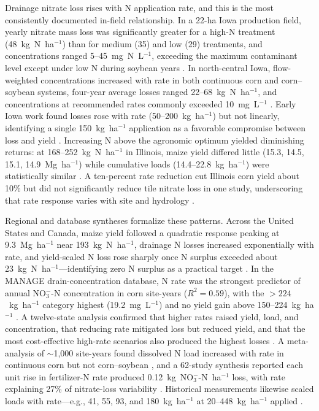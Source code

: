 \documentclass[11pt]{article}
\begin{document}
Drainage nitrate loss rises with N application rate, and this is the most consistently documented in-field relationship. In a 22-ha Iowa production field, yearly nitrate mass loss was significantly greater for a high-N treatment (48~kg~N~ha$^{-1}$) than for medium (35) and low (29) treatments, and concentrations ranged 5--45~mg~N~L$^{-1}$, exceeding the maximum contaminant level except under low N during soybean years \parencite{Jaynes2001}. In north-central Iowa, flow-weighted concentrations increased with rate in both continuous corn and corn--soybean systems, four-year average losses ranged 22--68~kg~N~ha$^{-1}$, and concentrations at recommended rates commonly exceeded 10~mg~L$^{-1}$ \parencite{Helmers2012b}. Early Iowa work found losses rose with rate (50--200~kg~ha$^{-1}$) but not linearly, identifying a single 150~kg~ha$^{-1}$ application as a favorable compromise between loss and yield \parencite{Azevedo1997}. Increasing N above the agronomic optimum yielded diminishing returns: at 168--252~kg~N~ha$^{-1}$ in Illinois, maize yield differed little (15.3, 14.5, 15.1, 14.9~Mg~ha$^{-1}$) while cumulative loads (14.4--22.8~kg~ha$^{-1}$) were statistically similar \parencite{Li2023b}. A ten-percent rate reduction cut Illinois corn yield about 10\% but did not significantly reduce tile nitrate loss in one study, underscoring that rate response varies with site and hydrology \parencite{Gentry2024}.

Regional and database syntheses formalize these patterns. Across the United States and Canada, maize yield followed a quadratic response peaking at 9.3~Mg~ha$^{-1}$ near 193~kg~N~ha$^{-1}$, drainage N losses increased exponentially with rate, and yield-scaled N loss rose sharply once N surplus exceeded about 23~kg~N~ha$^{-1}$---identifying zero N surplus as a practical target \parencite{Zhao2016}. In the MANAGE drain-concentration database, N rate was the strongest predictor of annual NO$_3^-$-N concentration in corn site-years ($R^2=0.59$), with the $>224$~kg~ha$^{-1}$ category highest (19.2~mg~L$^{-1}$) and no yield gain above 150--224~kg~ha$^{-1}$ \parencite{Hertzberger2019}. A twelve-state analysis confirmed that higher rates raised yield, load, and concentration, that reducing rate mitigated loss but reduced yield, and that the most cost-effective high-rate scenarios also produced the highest losses \parencite{Liu2021}. A meta-analysis of $\sim$1{,}000 site-years found dissolved N load increased with rate in continuous corn but not corn--soybean \parencite{Christianson2015b}, and a 62-study synthesis reported each unit rise in fertilizer-N rate produced 0.12~kg~NO$_3^-$-N~ha$^{-1}$ loss, with rate explaining 27\% of nitrate-loss variability \parencite{Chatterjee2020b}. Historical measurements likewise scaled loads with rate---e.g., 41, 55, 93, and 180~kg~ha$^{-1}$ at 20--448~kg~ha$^{-1}$ applied \parencite{Ritter2015}.
\end{document}
